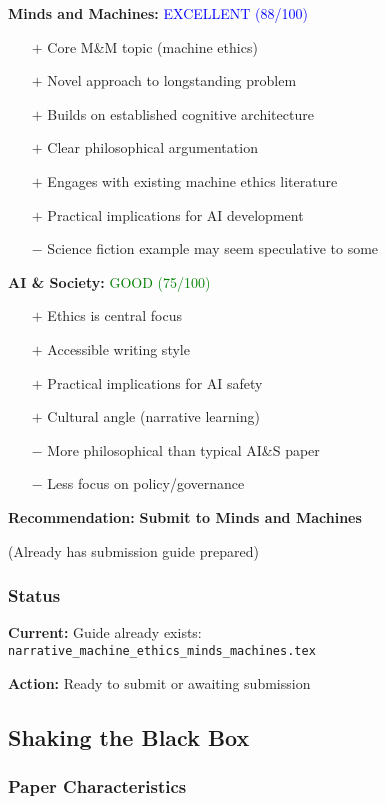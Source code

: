 \documentclass[12pt]{article}
\begin{document}
\textbf{Minds and Machines:} \textcolor{blue}{EXCELLENT (88/100)}

\begin{itemize}[leftmargin=*]
\item[$+$] Core M\&M topic (machine ethics)
\item[$+$] Novel approach to longstanding problem
\item[$+$] Builds on established cognitive architecture
\item[$+$] Clear philosophical argumentation
\item[$+$] Engages with existing machine ethics literature
\item[$+$] Practical implications for AI development
\item[$-$] Science fiction example may seem speculative to some
\end{itemize}

\textbf{AI \& Society:} \textcolor{green}{GOOD (75/100)}

\begin{itemize}[leftmargin=*]
\item[$+$] Ethics is central focus
\item[$+$] Accessible writing style
\item[$+$] Practical implications for AI safety
\item[$+$] Cultural angle (narrative learning)
\item[$-$] More philosophical than typical AI\&S paper
\item[$-$] Less focus on policy/governance
\end{itemize}

\textbf{Recommendation:} \textbf{Submit to Minds and Machines}

(Already has submission guide prepared)

\subsubsection{Status}

\textbf{Current:} Guide already exists: \texttt{narrative\_machine\_ethics\_minds\_machines.tex}

\textbf{Action:} Ready to submit or awaiting submission

\subsection{Shaking the Black Box}

\subsubsection{Paper Characteristics}
\end{document}
